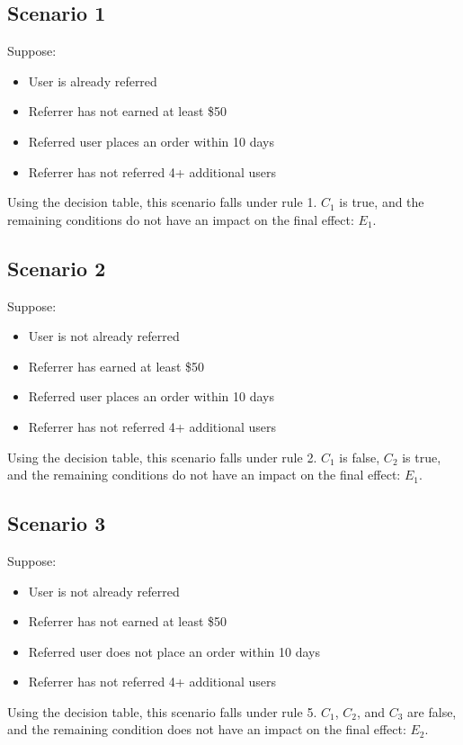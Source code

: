 \documentclass[10pt,letterpaper]{article}
\begin{document}
\subsection{Scenario 1}
Suppose:
\begin{itemize}
	\item{User is already referred}
	\item{Referrer has not earned at least \$50}
	\item{Referred user places an order within 10 days}
	\item{Referrer has not referred 4+ additional users}
\end{itemize}
Using the decision table, this scenario falls under rule 1. $C_1$ is true, and the remaining conditions do not have an impact on the final effect: $E_1$.

\subsection{Scenario 2}
Suppose:
\begin{itemize}
	\item{User is not already referred}
	\item{Referrer has earned at least \$50}
	\item{Referred user places an order within 10 days}
	\item{Referrer has not referred 4+ additional users}
\end{itemize}
Using the decision table, this scenario falls under rule 2. $C_1$ is false, $C_2$ is true, and the remaining conditions do not have an impact on the final effect: $E_1$.

\subsection{Scenario 3}
Suppose:
\begin{itemize}
	\item{User is not already referred}
	\item{Referrer has not earned at least \$50}
	\item{Referred user does not place an order within 10 days}
	\item{Referrer has not referred 4+ additional users}
\end{itemize}
Using the decision table, this scenario falls under rule 5. $C_1$, $C_2$, and $C_3$ are false, and the remaining condition does not have an impact on the final effect: $E_2$.
\end{document}
